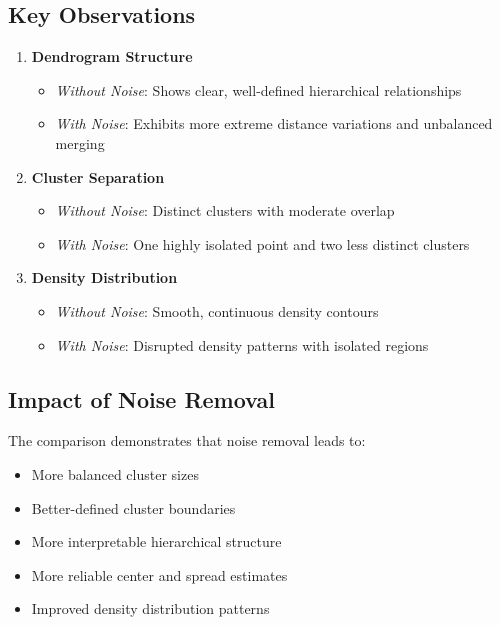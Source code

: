 \documentclass[12pt]{article}
\begin{document}
\subsection{Key Observations}
\begin{enumerate}
    \item \textbf{Dendrogram Structure}
    \begin{itemize}
        \item \textit{Without Noise}: Shows clear, well-defined hierarchical relationships
        \item \textit{With Noise}: Exhibits more extreme distance variations and unbalanced merging
    \end{itemize}
    
    \item \textbf{Cluster Separation}
    \begin{itemize}
        \item \textit{Without Noise}: Distinct clusters with moderate overlap
        \item \textit{With Noise}: One highly isolated point and two less distinct clusters
    \end{itemize}
    
    \item \textbf{Density Distribution}
    \begin{itemize}
        \item \textit{Without Noise}: Smooth, continuous density contours
        \item \textit{With Noise}: Disrupted density patterns with isolated regions
    \end{itemize}
\end{enumerate}

\subsection{Impact of Noise Removal}
The comparison demonstrates that noise removal leads to:
\begin{itemize}
    \item More balanced cluster sizes
    \item Better-defined cluster boundaries
    \item More interpretable hierarchical structure
    \item More reliable center and spread estimates
    \item Improved density distribution patterns
\end{itemize}
\end{document}
